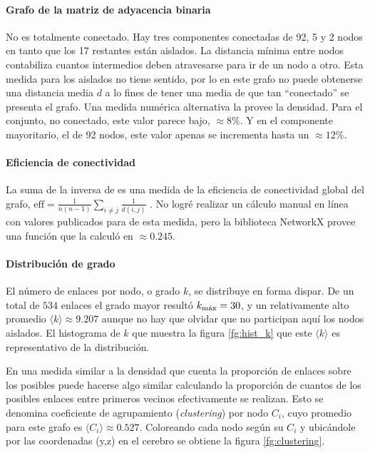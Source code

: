 \documentclass{article}
\begin{document}
\paragraph{Grafo de la matriz de adyacencia binaria}
No es totalmente conectado. Hay tres componentes conectadas de 92, 5 y 2 nodos en tanto que los 17 restantes están aislados.
La distancia mínima entre nodos contabiliza cuantos intermedios deben atravesarse para ir de un nodo a otro.
Esta medida para los aislados no tiene sentido, por lo en este grafo no puede obtenerse una distancia media $d$ a lo fines de tener una media de que tan ``conectado'' se presenta el grafo.
Una medida numérica alternativa la provee la densidad.
Para el conjunto, no conectado, este valor parece bajo, $\approx 8\%$.
Y en el componente mayoritario, el de 92 nodos, este valor apenas se incrementa hasta un $\approx 12\%$. 


\paragraph{Eficiencia de conectividad}
La suma de la inversa de es una medida de la eficiencia de conectividad global del grafo, $\mathrm{eff} = \frac{1}{n (n-1)} \sum_{i \neq j} \frac{1}{d(i,j)}$ \cite{ek_global_2015}.
No logré realizar un cálculo manual en línea con valores publicados para de esta medida, pero la biblioteca NetworkX provee una función que la calculó en $\approx 0.245$.


\paragraph{Distribución de grado}
El número de enlaces por nodo, o grado $k$, se distribuye en forma dispar.
De un total de $534$ enlaces el grado mayor resultó $k_\textnormal{máx} = 30$, y un relativamente alto promedio $\langle k \rangle \approx 9.207$ aunque no hay que olvidar que no participan aquí los nodos aislados.
El histograma de $k$ que muestra la figura \ref{fg:hist_k} que este $\langle k \rangle$ es representativo de la distribución.

En una medida similar a la densidad que cuenta la proporción de enlaces sobre los posibles puede hacerse algo similar calculando la proporción de cuantos de los posibles enlaces entre primeros vecinos efectivamente se realizan.
Esto se denomina coeficiente de agrupamiento (\emph{clustering}) por nodo $C_i$, cuyo promedio para este grafo es $\langle C_i \rangle \approx 0.527$. 
Coloreando cada nodo según su $C_i$ y ubicándole por las coordenadas (y,z) en el cerebro se obtiene la figura \ref{fg:clustering}. 
\end{document}
